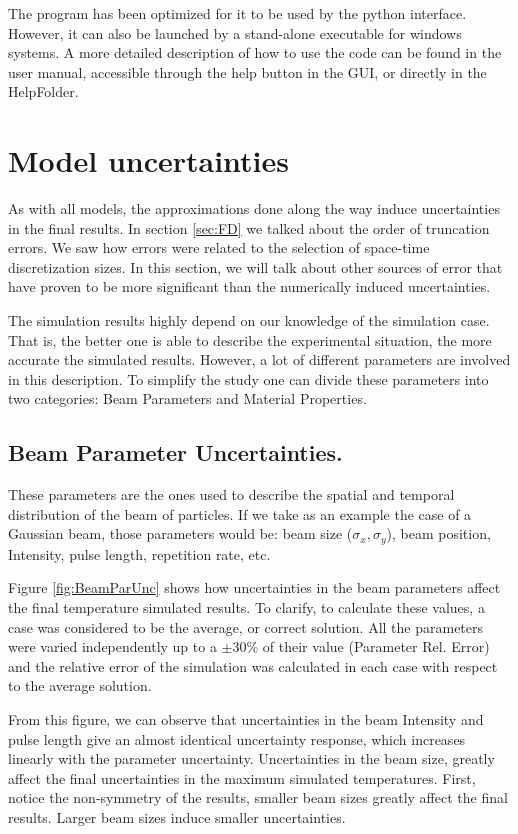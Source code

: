 The program has been optimized for it to be used by the python interface. However, it can also be launched by a stand-alone executable for windows systems. A more detailed description of how to use the code can be found in the user manual, accessible through the help button in the GUI, or directly in the HelpFolder.

\section{Model uncertainties}
\label{sec:ModelUnc}

As with all models, the approximations done along the way induce uncertainties in the final results. In section \ref{sec:FD} we talked about the order of truncation errors. We saw how errors were related to the selection of space-time discretization sizes. In this section, we will talk about other sources of error that have proven to be more significant than the numerically induced uncertainties. 

The simulation results highly depend on our knowledge of the simulation case. That is, the better one is able to describe the experimental situation, the more accurate the simulated results. However, a lot of different parameters are involved in this description. To simplify the study one can divide these parameters into two categories: Beam Parameters and Material Properties. 

\subsection{Beam Parameter Uncertainties.}

These parameters are the ones used to describe the spatial and temporal distribution of the beam of particles. If we take as an example the case of a Gaussian beam, those parameters would be: beam size ($\sigma_x , \sigma_y$), beam position, Intensity, pulse length, repetition rate, etc. 

Figure \ref{fig:BeamParUnc} shows how uncertainties in the beam parameters affect the final temperature simulated results. To clarify, to calculate these values, a case was considered to be the average, or correct solution. All the parameters were varied independently up to a $\pm 30\%$ of their value (Parameter Rel. Error)  and the relative error of the simulation was calculated in each case with respect to the average solution. 

From this figure, we can observe that uncertainties in the beam Intensity and pulse length give an almost identical uncertainty response, which increases linearly with the parameter uncertainty. Uncertainties in the beam size, greatly affect the final uncertainties in the maximum simulated temperatures. First, notice the non-symmetry of the results, smaller beam sizes greatly affect the final results. Larger beam sizes induce smaller uncertainties. 

